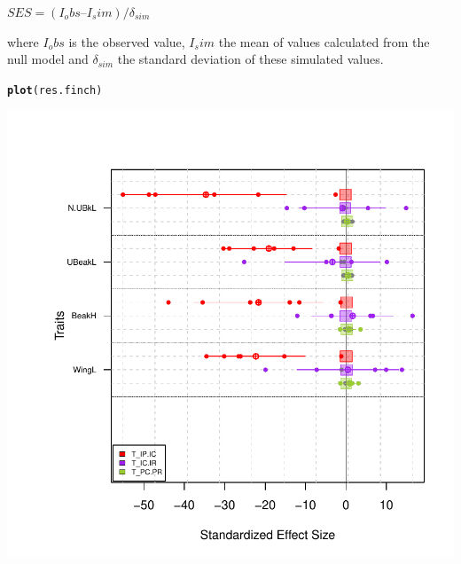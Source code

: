 \documentclass[12pt]{article}\usepackage[]{graphicx}\usepackage[]{color}
\makeatletter
\def\maxwidth{ %
  \ifdim\Gin@nat@width>\linewidth
    \linewidth
  \else
    \Gin@nat@width
  \fi
}
\newcommand{\hlstd}[1]{\textcolor[rgb]{0.345,0.345,0.345}{#1}}%
\newcommand{\hlkwd}[1]{\textcolor[rgb]{0.737,0.353,0.396}{\textbf{#1}}}%
\newenvironment{kframe}{%
 \def\at@end@of@kframe{}%
 \ifinner\ifhmode%
  \def\at@end@of@kframe{\end{minipage}}%
  \begin{minipage}{\columnwidth}%
 \fi\fi%
 \def\FrameCommand##1{\hskip\@totalleftmargin \hskip-\fboxsep
 \colorbox{shadecolor}{##1}\hskip-\fboxsep
     \hskip-\linewidth \hskip-\@totalleftmargin \hskip\columnwidth}%
 \MakeFramed {\advance\hsize-\width
   \@totalleftmargin\z@ \linewidth\hsize
   \@setminipage}}%
 {\par\unskip\endMakeFramed%
 \at@end@of@kframe}
\newenvironment{knitrout}{}{} %
\makeatother
\begin{document}
\begin{center}
$SES = (I_obs – I_sim) / \delta_{sim}$
\end{center}

where $I_obs$ is the observed value, $I_sim$ the mean of values calculated from the null model and $\delta_{sim}$ the standard deviation of these simulated values.

\begin{knitrout}
\color{fgcolor}\begin{kframe}
\begin{alltt}
\hlkwd{plot}\hlstd{(res.finch)}
\end{alltt}
\end{kframe}

{\centering \includegraphics[width=\maxwidth]{figure/unnamed-chunk-34} 

}



\end{knitrout}
\end{document}
